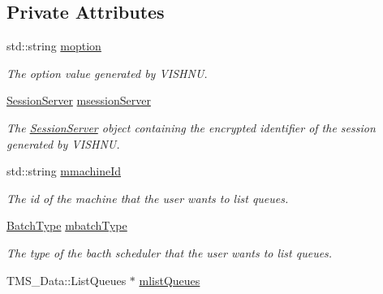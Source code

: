 \subsection*{Private Attributes}
\begin{DoxyCompactItemize}
\item 
\hypertarget{classListQueuesServer_abf9127ca126d9dfd793a4e6c50ca6486}{
std::string \hyperlink{classListQueuesServer_abf9127ca126d9dfd793a4e6c50ca6486}{moption}}
\label{classListQueuesServer_abf9127ca126d9dfd793a4e6c50ca6486}

\begin{DoxyCompactList}\small\item\em The option value generated by VISHNU. \item\end{DoxyCompactList}\item 
\hypertarget{classListQueuesServer_afbacebe68874971368ee1e8ab3a144dc}{
\hyperlink{classSessionServer}{SessionServer} \hyperlink{classListQueuesServer_afbacebe68874971368ee1e8ab3a144dc}{msessionServer}}
\label{classListQueuesServer_afbacebe68874971368ee1e8ab3a144dc}

\begin{DoxyCompactList}\small\item\em The \hyperlink{classSessionServer}{SessionServer} object containing the encrypted identifier of the session generated by VISHNU. \item\end{DoxyCompactList}\item 
\hypertarget{classListQueuesServer_a2702f2dba56603b874f625fc47d5d73e}{
std::string \hyperlink{classListQueuesServer_a2702f2dba56603b874f625fc47d5d73e}{mmachineId}}
\label{classListQueuesServer_a2702f2dba56603b874f625fc47d5d73e}

\begin{DoxyCompactList}\small\item\em The id of the machine that the user wants to list queues. \item\end{DoxyCompactList}\item 
\hypertarget{classListQueuesServer_a2d908db495353d8086b16fbb10d8d4f6}{
\hyperlink{utilVishnu_8hpp_a864d748e7097d176552dd4c7635016ea}{BatchType} \hyperlink{classListQueuesServer_a2d908db495353d8086b16fbb10d8d4f6}{mbatchType}}
\label{classListQueuesServer_a2d908db495353d8086b16fbb10d8d4f6}

\begin{DoxyCompactList}\small\item\em The type of the bacth scheduler that the user wants to list queues. \item\end{DoxyCompactList}\item 
\hypertarget{classListQueuesServer_a49d392919bc0dba8a8821b6edd7e3efb}{
TMS\_\-Data::ListQueues $\ast$ \hyperlink{classListQueuesServer_a49d392919bc0dba8a8821b6edd7e3efb}{mlistQueues}}
\label{classListQueuesServer_a49d392919bc0dba8a8821b6edd7e3efb}


\end{DoxyCompactItemize}
